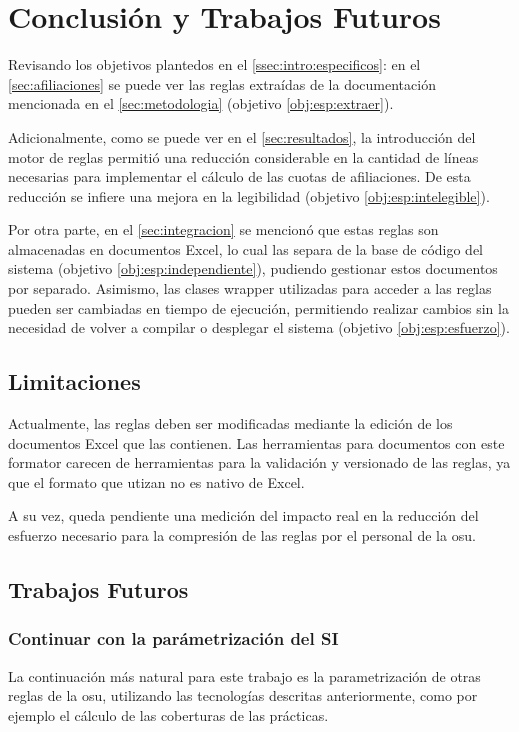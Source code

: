 \section{Conclusión y Trabajos Futuros}\label{sec:conclusiones}

Revisando los objetivos plantedos en el \cref{ssec:intro:especificos}: en el \cref{sec:afiliaciones} se puede ver las reglas extraídas de la documentación mencionada en el \cref{sec:metodologia} (objetivo \ref{obj:esp:extraer}).

Adicionalmente, como se puede ver en el \cref{sec:resultados}, la introducción del motor de reglas permitió una reducción considerable en la cantidad de líneas necesarias para implementar el cálculo de las cuotas de afiliaciones. De esta reducción se infiere una mejora en la legibilidad (objetivo \ref{obj:esp:intelegible}).

Por otra parte, en el \cref{sec:integracion} se mencionó que estas reglas son almacenadas en documentos Excel, lo cual las separa de la base de código del sistema (objetivo \ref{obj:esp:independiente}), pudiendo gestionar estos documentos por separado. Asimismo, las clases wrapper utilizadas para acceder a las reglas pueden ser cambiadas en tiempo de ejecución, permitiendo realizar cambios sin la necesidad de volver a compilar o desplegar el sistema (objetivo \ref{obj:esp:esfuerzo}).

\subsection{Limitaciones}
Actualmente, las reglas deben ser modificadas mediante la edición de los documentos Excel que las contienen. Las herramientas para documentos con este formator carecen de herramientas para la validación y versionado de las reglas, ya que el formato que utizan no es nativo de Excel.

A su vez, queda pendiente una medición del impacto real en la reducción del esfuerzo necesario para la compresión de las reglas por el personal de la \acrshort{osu}.

\subsection{Trabajos Futuros}

\subsubsection{Continuar con la parámetrización del SI}
La continuación más natural para este trabajo es la parametrización de otras reglas de la \acrshort{osu}, utilizando las tecnologías descritas anteriormente, como por ejemplo el cálculo de las coberturas de las prácticas.


